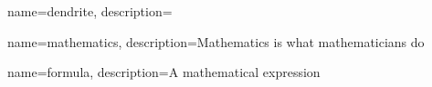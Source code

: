 

\usepackage{glossaries}

\makeglossaries

{
        name=dendrite,
        description={}
}

{
        name=mathematics,
        description={Mathematics is what mathematicians do}
}

{
        name=formula,
        description={A mathematical expression}
}


